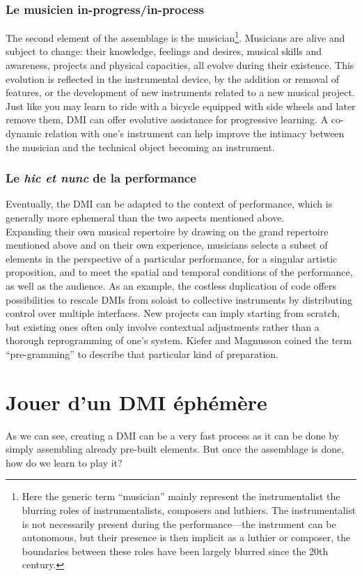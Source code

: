 \subsubsection{Le musicien in-progress/in-process}
The second element of the assemblage is the musician\footnote{Here the generic term “musician” mainly represent the instrumentalist the blurring roles of instrumentalists, composers and luthiers. The instrumentalist is not necessarily present during the performance—the instrument can be autonomous, but their presence is then implicit as a luthier or composer, the boundaries between these roles have been largely blurred since the 20th century.}. Musicians are alive and subject to change: their knowledge, feelings and desires, musical skills and awareness, projects and physical capacities, all evolve during their existence. This evolution is reflected in the instrumental device, by the addition or removal of features, or the development of new instruments related to a new musical project. Just like you may learn to ride with a bicycle equipped with side wheels and later remove them, DMI can offer evolutive assistance for progressive learning. A co-dynamic relation with one's instrument can help improve the intimacy between the musician and the technical object becoming an instrument.

\subsubsection{Le \textit{hic et nunc} de la performance}
Eventually, the DMI can be adapted to the context of performance, which is generally more ephemeral than the two aspects mentioned above.\\
\indent Expanding their own musical repertoire by drawing on the grand repertoire mentioned above and on their own experience, musicians selects a subset of elements in the perspective of a particular performance, for a singular artistic proposition, and to meet the spatial and temporal conditions of the performance, as well as the audience. As an example, the costless duplication of code offers possibilities to rescale DMIs from soloist to collective instruments by distributing control over multiple interfaces. New projects can imply starting from scratch, but existing ones often only involve contextual adjustments rather than a thorough reprogramming of one's system. Kiefer and Magnusson coined the term “pre-gramming” \cite{kiefer_live_2019} to describe that particular kind of preparation.
	

\section{Jouer d'un DMI éphémère}
As we can see, creating a DMI can be a very fast process as it can be done by simply assembling already pre-built elements. But once the assemblage is done, how do we learn to play it?

